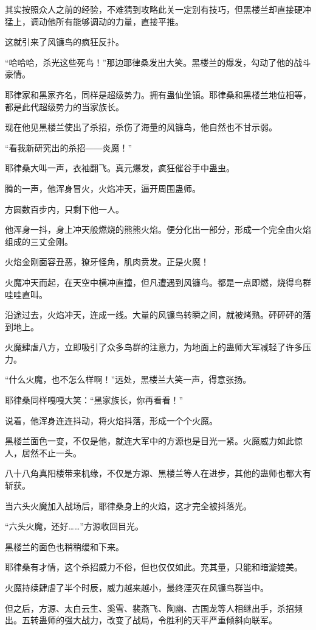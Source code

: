 \begin{this_body}
其实按照众人之前的经验，不难猜到攻略此关一定别有技巧，但黑楼兰却直接硬冲猛上，调动他所有能够调动的力量，直接平推。

这就引来了风镰鸟的疯狂反扑。

“哈哈哈，杀光这些死鸟！”那边耶律桑发出大笑。黑楼兰的爆发，勾动了他的战斗豪情。

耶律家和黑家齐名，同样是超级势力。拥有蛊仙坐镇。耶律桑和黑楼兰地位相等，都是此代超级势力的当家族长。

现在他见黑楼兰使出了杀招，杀伤了海量的风镰鸟，他自然也不甘示弱。

“看我新研究出的杀招――炎魔！”

耶律桑大叫一声，衣袖翻飞。真元爆发，疯狂催谷手中蛊虫。

腾的一声，他浑身冒火，火焰冲天，逼开周围蛊师。

方圆数百步内，只剩下他一人。

他浑身一抖，身上冲天般燃烧的熊熊火焰。便分化出一部分，形成一个完全由火焰组成的三丈金刚。

火焰金刚面容丑恶，獠牙怪角，肌肉贲发。正是火魔！

火魔冲天而起，在天空中横冲直撞，但凡遭遇到风镰鸟。都是一点即燃，烧得鸟群哇哇直叫。

沿途过去，火焰冲天，连成一线。大量的风镰鸟转瞬之间，就被烤熟。砰砰砰的落到地上。

火魔肆虐八方，立即吸引了众多鸟群的注意力，为地面上的蛊师大军减轻了许多压力。

“什么火魔，也不怎么样啊！”远处，黑楼兰大笑一声，得意张扬。

耶律桑同样嘎嘎大笑：“黑家族长，你再看看！”

说着，他浑身连连抖动，将火焰抖落，形成一个个火魔。

黑楼兰面色一变，不仅是他，就连大军中的方源也是目光一紧。火魔威力如此惊人，居然不止一头。

八十八角真阳楼带来机缘，不仅是方源、黑楼兰等人在进步，其他的蛊师也都大有斩获。

当六头火魔加入战场后，耶律桑身上的火焰，这才完全被抖落光。

“六头火魔，还好……”方源收回目光。

黑楼兰的面色也稍稍缓和下来。

耶律桑有才情，这个杀招威力不俗，但也仅仅如此。充其量，只能和暗漩媲美。

火魔持续肆虐了半个时辰，威力越来越小，最终湮灭在风镰鸟群当中。

但之后，方源、太白云生、奚雪、裴燕飞、陶幽、古国龙等人相继出手，杀招频出。五转蛊师的强大战力，改变了战局，令胜利的天平严重倾斜向联军。


\end{this_body}
